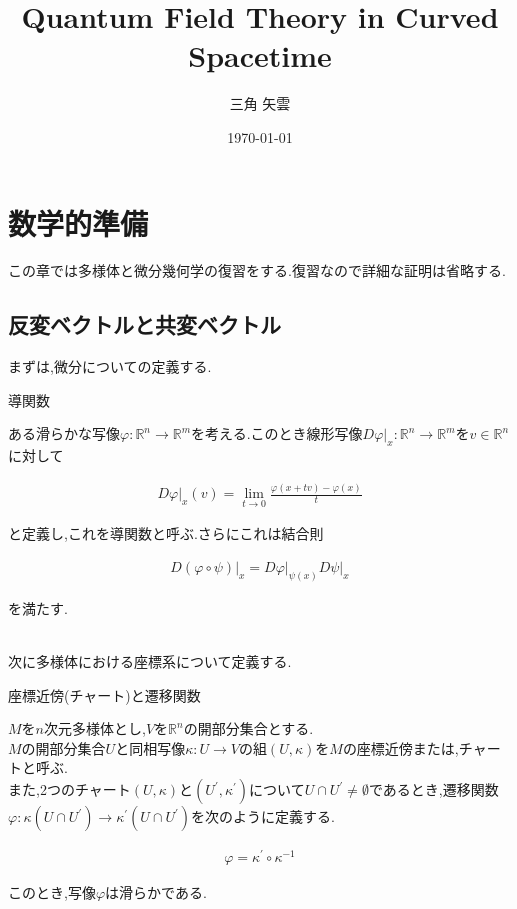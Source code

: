 \documentclass{jsarticle}
\title{Quantum Field Theory in Curved Spacetime}
\author{三角 矢雲}
\date{\today}
\begin{document}
\maketitle

\section{数学的準備}

この章では多様体と微分幾何学の復習をする.復習なので詳細な証明は省略する.

\subsection{反変ベクトルと共変ベクトル}

まずは,微分についての定義する.

\begin{itembox}[l]{導関数}

ある滑らかな写像$\varphi:\mathbb{R}^n \to \mathbb{R}^m$を考える.このとき線形写像$D\varphi\rvert_x:\mathbb{R}^n \to \mathbb{R}^m$を$v \in \mathbb{R}^n$に対して

\begin{align}
D\varphi\rvert_x (v) =\lim_{t \to 0} \frac{\varphi(x+tv) - \varphi(x)}{t}
\end{align}

と定義し,これを導関数と呼ぶ.さらにこれは結合則

\begin{align}
D(\varphi \circ \psi)\rvert_x = D\varphi\rvert_{\psi(x)}D\psi\rvert_x
\end{align}

を満たす.

\end{itembox}\\

次に多様体における座標系について定義する.

\begin{itembox}[l]{座標近傍(チャート)と遷移関数}

$M$を$n$次元多様体とし,$V$を$\mathbb{R}^n$の開部分集合とする.\\
$M$の開部分集合$U$と同相写像$\kappa:U \to V$の組$(U,\kappa)$を$M$の座標近傍または,チャートと呼ぶ.\\
また,2つのチャート$(U,\kappa)$と$(U^\prime,\kappa^\prime)$について$U \cap U^\prime \neq\emptyset$であるとき,遷移関数$\varphi:\kappa(U \cap U^\prime) \to \kappa^\prime(U \cap U^\prime)$を次のように定義する.

\begin{align}
\varphi = \kappa^\prime \circ \kappa^{-1}
\end{align}

このとき,写像$\varphi$は滑らかである.

\end{itembox}
\end{document}
